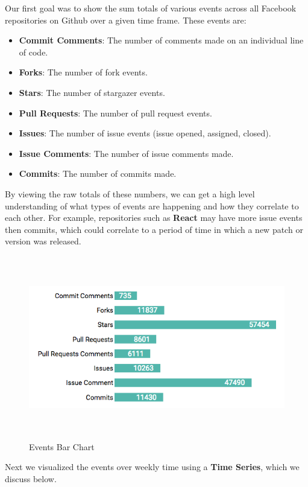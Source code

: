 \documentclass{article}
\begin{document}
Our first goal was to show the sum totals of various events across all Facebook repositories on Github over a given time frame. These events are:

\begin {itemize}
	\item \textbf{Commit Comments}: The number of comments made on an individual line of code.
	\item \textbf{Forks}: The number of fork events.
	\item \textbf{Stars}: The number of stargazer events.
	\item \textbf{Pull Requests}: The number of pull request events.
	\item \textbf{Issues}: The number of issue events (issue opened, assigned, closed).
	\item \textbf{Issue Comments}: The number of issue comments made.
	\item \textbf{Commits}: The number of commits made.
\end {itemize}

By viewing the raw totals of these numbers, we can get a high level understanding of what types of events are happening and how they correlate to each other. 
For example, repositories such as \textbf{React} may have more issue events then commits, which could correlate to a period of time in which a new patch or version was released.

\begin{figure}[h!]
\centering
\includegraphics[height=8cm, width=16cm]{bar}
\caption{Events Bar Chart}
\end{figure}

Next we visualized the events over weekly time using a \textbf{Time Series}, which we discuss below.
\end{document}
